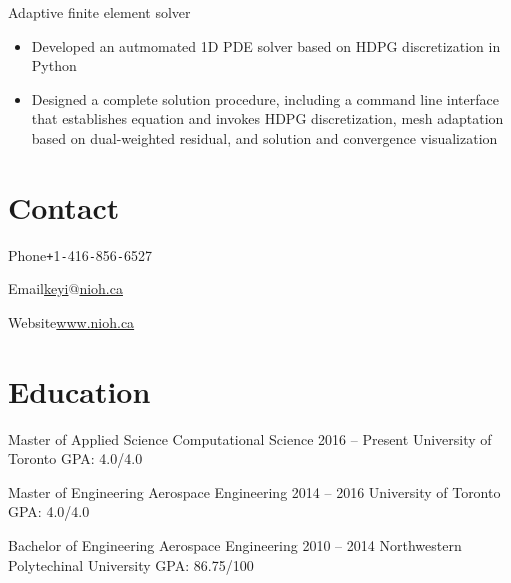 \documentclass{tccv}
\begin{document}
\begin{eventlist}
  {Adaptive finite element solver}
  \begin{itemize}
    \item Developed an autmomated 1D PDE solver based on HDPG discretization in Python
    \item Designed a complete solution procedure, including a command line interface that establishes equation and invokes HDPG discretization, mesh adaptation based on dual-weighted residual, and solution and convergence visualization
  \end{itemize}

  

  


\end{eventlist}
\needspace{0.5\textheight}
\section{Contact}
\begin{factlist}
  \item{Phone}{\texttt{+}1\texttt{-}416\texttt{-}856\texttt{-}6527}
  \item{Email}{\href{mailto:keyi@nioh.ca}{keyi$@$nioh.ca}}
  \item{Website}{\href{https://nioh.ca}{www.nioh.ca}}
\end{factlist}

\section{Education}
\begin{yearlist}
  \item[Master of Applied Science \newline Computational Science]{2016 -- Present}
  {University of Toronto}
  {GPA: 4.0/4.0}
  \item[Master of Engineering \newline Aerospace Engineering]{2014 -- 2016}
  {University of Toronto}
  {GPA: 4.0/4.0}
  \item[Bachelor of Engineering \newline Aerospace Engineering]{2010 -- 2014}
  {Northwestern Polytechinal University}
  {GPA: 86.75/100}
\end{yearlist}
\end{document}
